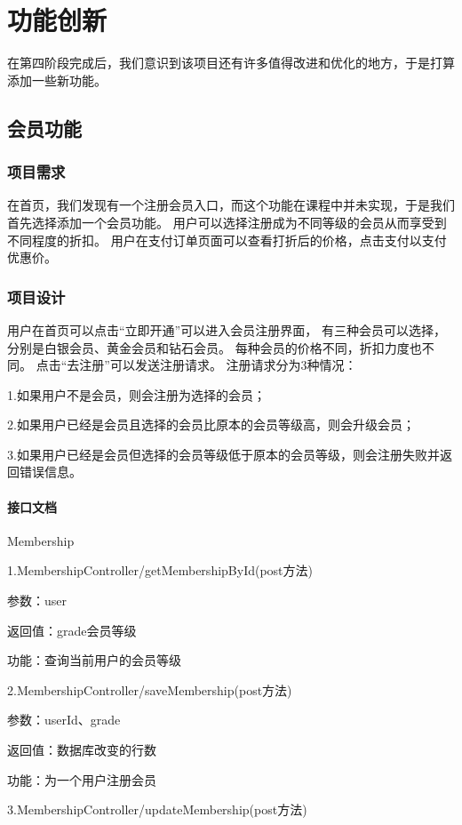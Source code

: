 
\chapter{功能创新}

在第四阶段完成后，我们意识到该项目还有许多值得改进和优化的地方，于是打算添加一些新功能。

\section{会员功能}
\subsection{项目需求}
在首页，我们发现有一个注册会员入口，而这个功能在课程中并未实现，于是我们首先选择添加一个会员功能。
用户可以选择注册成为不同等级的会员从而享受到不同程度的折扣。
用户在支付订单页面可以查看打折后的价格，点击支付以支付优惠价。

\subsection{项目设计}
用户在首页可以点击“立即开通”可以进入会员注册界面，
有三种会员可以选择，分别是白银会员、黄金会员和钻石会员。
每种会员的价格不同，折扣力度也不同。
点击“去注册”可以发送注册请求。
注册请求分为3种情况：

1.如果用户不是会员，则会注册为选择的会员；

2.如果用户已经是会员且选择的会员比原本的会员等级高，则会升级会员；

3.如果用户已经是会员但选择的会员等级低于原本的会员等级，则会注册失败并返回错误信息。

\subsubsection*{接口文档}
Membership

1.MembershipController/getMembershipById(post方法)

参数：user

返回值：grade会员等级

功能：查询当前用户的会员等级

2.MembershipController/saveMembership(post方法)

参数：userId、grade

返回值：数据库改变的行数

功能：为一个用户注册会员

3.MembershipController/updateMembership(post方法)

